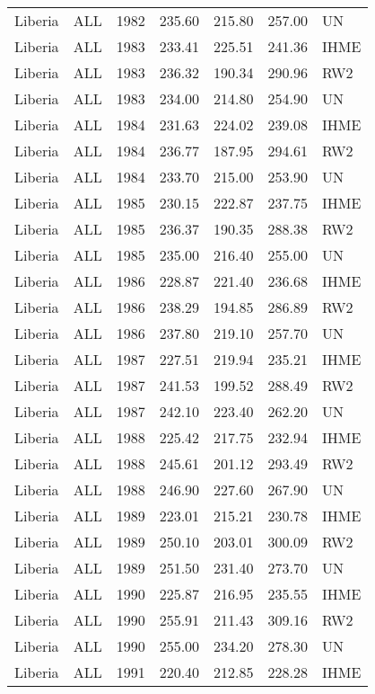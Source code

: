 \begin{longtable}{lllrrrl}
  Liberia & ALL & 1982 & 235.60 & 215.80 & 257.00 & UN \\ 
  Liberia & ALL & 1983 & 233.41 & 225.51 & 241.36 & IHME \\ 
  Liberia & ALL & 1983 & 236.32 & 190.34 & 290.96 & RW2 \\ 
  Liberia & ALL & 1983 & 234.00 & 214.80 & 254.90 & UN \\ 
  Liberia & ALL & 1984 & 231.63 & 224.02 & 239.08 & IHME \\ 
  Liberia & ALL & 1984 & 236.77 & 187.95 & 294.61 & RW2 \\ 
  Liberia & ALL & 1984 & 233.70 & 215.00 & 253.90 & UN \\ 
  Liberia & ALL & 1985 & 230.15 & 222.87 & 237.75 & IHME \\ 
  Liberia & ALL & 1985 & 236.37 & 190.35 & 288.38 & RW2 \\ 
  Liberia & ALL & 1985 & 235.00 & 216.40 & 255.00 & UN \\ 
  Liberia & ALL & 1986 & 228.87 & 221.40 & 236.68 & IHME \\ 
  Liberia & ALL & 1986 & 238.29 & 194.85 & 286.89 & RW2 \\ 
  Liberia & ALL & 1986 & 237.80 & 219.10 & 257.70 & UN \\ 
  Liberia & ALL & 1987 & 227.51 & 219.94 & 235.21 & IHME \\ 
  Liberia & ALL & 1987 & 241.53 & 199.52 & 288.49 & RW2 \\ 
  Liberia & ALL & 1987 & 242.10 & 223.40 & 262.20 & UN \\ 
  Liberia & ALL & 1988 & 225.42 & 217.75 & 232.94 & IHME \\ 
  Liberia & ALL & 1988 & 245.61 & 201.12 & 293.49 & RW2 \\ 
  Liberia & ALL & 1988 & 246.90 & 227.60 & 267.90 & UN \\ 
  Liberia & ALL & 1989 & 223.01 & 215.21 & 230.78 & IHME \\ 
  Liberia & ALL & 1989 & 250.10 & 203.01 & 300.09 & RW2 \\ 
  Liberia & ALL & 1989 & 251.50 & 231.40 & 273.70 & UN \\ 
  Liberia & ALL & 1990 & 225.87 & 216.95 & 235.55 & IHME \\ 
  Liberia & ALL & 1990 & 255.91 & 211.43 & 309.16 & RW2 \\ 
  Liberia & ALL & 1990 & 255.00 & 234.20 & 278.30 & UN \\ 
  Liberia & ALL & 1991 & 220.40 & 212.85 & 228.28 & IHME \\ 

\end{longtable}
